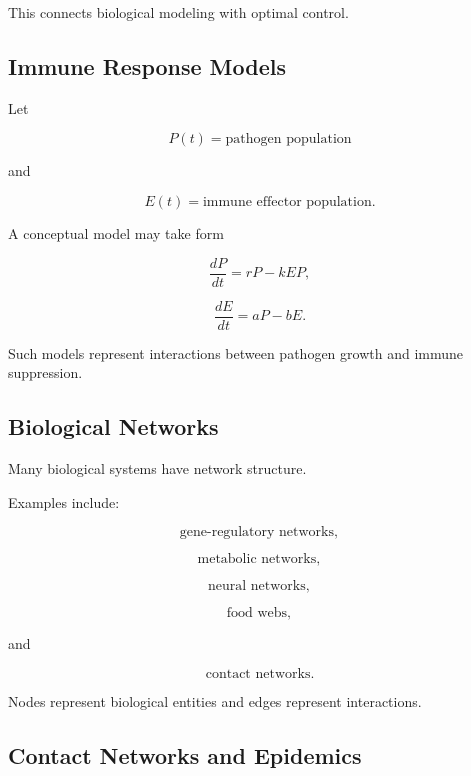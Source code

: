 This connects biological modeling with optimal control.

\subsection{Immune Response Models}
\label{subsec:immune-response-models}

Let

\[
P(t)
=
\text{pathogen population}
\]

and

\[
E(t)
=
\text{immune effector population}.
\]

A conceptual model may take form

\[
\boxed{
\frac{dP}{dt}
=
rP-kEP,
}
\]

\[
\boxed{
\frac{dE}{dt}
=
aP-bE.
}
\]

Such models represent interactions between pathogen growth and immune
suppression.

\subsection{Biological Networks}
\label{subsec:biological-networks}

Many biological systems have network structure.

Examples include:

\[
\boxed{
\text{gene-regulatory networks},
}
\]

\[
\boxed{
\text{metabolic networks},
}
\]

\[
\boxed{
\text{neural networks},
}
\]

\[
\boxed{
\text{food webs},
}
\]

and

\[
\boxed{
\text{contact networks}.
}
\]

Nodes represent biological entities and edges represent interactions.

\subsection{Contact Networks and Epidemics}
\label{subsec:contact-network-epidemics}

